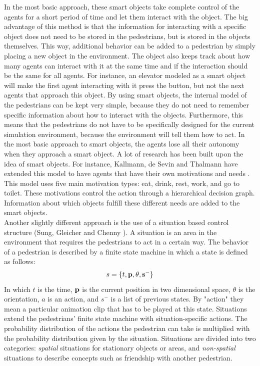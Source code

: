 \documentclass[11pt]{article}
\begin{document}
In the most basic approach, these smart objects take complete control of the agents for a short period of time and let them interact with the object. The big advantage of this method is that the information for interacting with a specific object does not need to be stored in the pedestrians, but is stored in the objects themselves. This way, additional behavior can be added to a pedestrian by simply placing a new object in the environment.  The object also keeps track about how many agents can interact with it at the same time and if the interaction should be the same for all agents. For instance, an elevator modeled as a smart object will make the first agent interacting with it press the button, but not the next agents that approach this object. By using smart objects, the internal model of the pedestrians can be kept very simple, because they do not need to remember specific information about how to interact with the objects. Furthermore, this means that the pedestrians do not have to be specifically designed for the current simulation environment, because the environment will tell them how to act. In the most basic approach to smart objects, the agents lose all their autonomy when they approach a smart object. A lot of research has been built upon the idea of smart objects. For instance, Kallmann, de Sevin and Thalmann have extended this model to have agents that have their own motivations and needs \cite{Kallmann00constructingvirtual}. This model uses five main motivation types: eat, drink, rest, work, and go to toilet. These motivations control the action through a hierarchical decision graph. Information about which objects fulfill these different needs are added to the smart objects.\\






Another slightly different approach is the use of a situation based control structure (Sung, Gleicher and Chenny \cite{Sung04scalablebehaviors}). A situation is an area in the environment that requires the pedestrians to act in a certain way. The behavior of a pedestrian is described by a finite state machine in which a state is defined as follows:
 \[s = \{t, \bf{p}, \theta, s^- \}\]
In which $t$ is the time, $\bf{p}$ is the current position in two dimensional space, $\theta$ is the orientation, $a$ is an action, and $s^-$ is a list of previous states. By "action" they mean a particular animation clip that has to be played at this state. Situations extend the pedestrians' finite state machine with situation-specific actions. The probability distribution of the actions the pedestrian can take is multiplied with the probability distribution given by the situation. Situations are divided into two categories: \emph{spatial} situations for stationary objects or areas, and \emph{non-spatial} situations to describe concepts such as friendship with another pedestrian.
\end{document}
